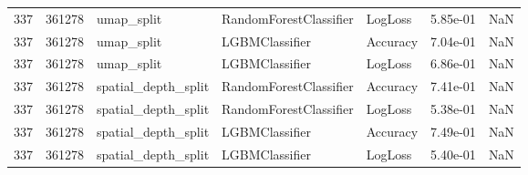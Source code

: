 \begin{tabular}{rrlllrr}
337 & 361278 & umap\_split & RandomForestClassifier & LogLoss & 5.85e-01 & NaN \\
337 & 361278 & umap\_split & LGBMClassifier & Accuracy & 7.04e-01 & NaN \\
337 & 361278 & umap\_split & LGBMClassifier & LogLoss & 6.86e-01 & NaN \\
337 & 361278 & spatial\_depth\_split & RandomForestClassifier & Accuracy & 7.41e-01 & NaN \\
337 & 361278 & spatial\_depth\_split & RandomForestClassifier & LogLoss & 5.38e-01 & NaN \\
337 & 361278 & spatial\_depth\_split & LGBMClassifier & Accuracy & 7.49e-01 & NaN \\
337 & 361278 & spatial\_depth\_split & LGBMClassifier & LogLoss & 5.40e-01 & NaN \\
\bottomrule
\end{tabular}
